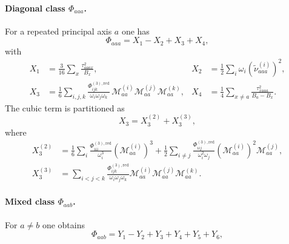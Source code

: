 \paragraph{Diagonal class $\Phi_{aaa}$.}
For a repeated principal axis $a$ one has
\begin{equation}
\Phi_{aaa}=X_1-X_2+X_3+X_4,
\end{equation}
with
\begin{align}
X_1 &= \frac{3}{16}\sum_x\frac{\tau_{aaax}^2}{B_x},&
X_2 &= \frac{1}{2}\sum_i \omega_i\left(\widetilde{\nu}^{(i)}_{aaa}\right)^2,\\
X_3 &= \frac{1}{6}\sum_{i,j,k}
\frac{\Phi^{(3),\mathrm{red}}_{ijk}}{\omega_i\omega_j\omega_k}\,
\mathcal{M}^{(i)}_{aa}\mathcal{M}^{(j)}_{aa}\mathcal{M}^{(k)}_{aa},&
X_4 &= \frac{1}{4}\sum_{x\neq a}
\frac{\tau_{xaaa}^2}{B_a-B_x}.
\end{align}
The cubic term is partitioned as
\begin{equation}
X_3=X_3^{(2)}+X_3^{(3)},
\end{equation}
where
\begin{align}
X_3^{(2)}
&=
\frac{1}{6}\sum_i
\frac{\Phi^{(3),\mathrm{red}}_{iii}}{\omega_i^3}
\left(\mathcal{M}^{(i)}_{aa}\right)^3
+\frac{1}{2}\sum_{i\neq j}
\frac{\Phi^{(3),\mathrm{red}}_{iij}}{\omega_i^2\omega_j}
\left(\mathcal{M}^{(i)}_{aa}\right)^2\mathcal{M}^{(j)}_{aa},
\\
X_3^{(3)}
&=
\sum_{i<j<k}
\frac{\Phi^{(3),\mathrm{red}}_{ijk}}{\omega_i\omega_j\omega_k}
\mathcal{M}^{(i)}_{aa}\mathcal{M}^{(j)}_{aa}\mathcal{M}^{(k)}_{aa}.
\end{align}

\paragraph{Mixed class $\Phi_{aab}$.}
For $a \neq b$ one obtains
\begin{equation}
\Phi_{aab}=Y_1-Y_2+Y_3+Y_4+Y_5+Y_6,
\end{equation}

